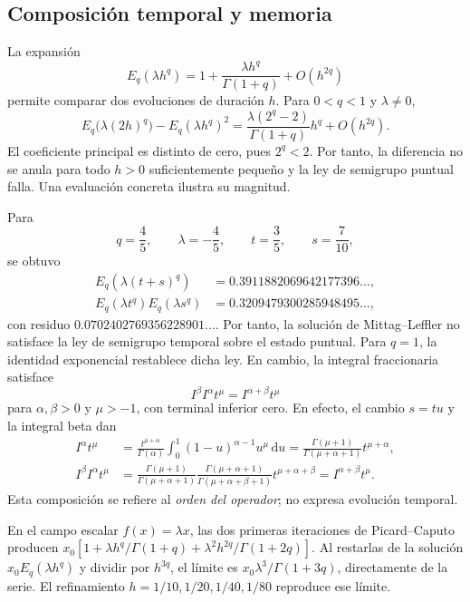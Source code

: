 \subsection{Composición temporal y memoria}

La expansión
\[
 E_q(\lambda h^q)=1+\frac{\lambda h^q}{\Gamma(1+q)}+O(h^{2q})
\]
permite comparar dos evoluciones de duración \(h\). Para \(0<q<1\) y
\(\lambda\ne0\),
\[
 E_q\bigl(\lambda(2h)^q\bigr)-E_q(\lambda h^q)^2
 =\frac{\lambda(2^q-2)}{\Gamma(1+q)}h^q+O(h^{2q}).
\]
El coeficiente principal es distinto de cero, pues \(2^q<2\). Por tanto,
la diferencia no se anula para todo \(h>0\) suficientemente pequeño y la ley
de semigrupo puntual falla. Una evaluación concreta ilustra su magnitud.

Para
\[
 q=\frac45,\qquad \lambda=-\frac45,\qquad
 t=\frac35,\qquad s=\frac7{10},
\]
se obtuvo
\begin{align}
 E_q\!\left(\lambda(t+s)^q\right)
 &=
 0.3911882069642177396\ldots,\\
 E_q(\lambda t^q)E_q(\lambda s^q)
 &=
 0.3209479300285948495\ldots,
\end{align}
con residuo \(0.0702402769356228901\ldots\). Por tanto, la solución de Mittag--Leffler no satisface la ley de semigrupo
temporal sobre el estado puntual. Para \(q=1\), la identidad exponencial
restablece dicha ley. En cambio, la integral fraccionaria satisface
\[
 I^\beta I^\alpha t^\mu=I^{\alpha+\beta}t^\mu
\]
para \(\alpha,\beta>0\) y \(\mu>-1\), con terminal inferior cero. En efecto,
el cambio \(s=tu\) y la integral beta dan
\begin{align*}
 I^\alpha t^\mu
 &=\frac{t^{\mu+\alpha}}{\Gamma(\alpha)}
   \int_0^1(1-u)^{\alpha-1}u^\mu\,\mathrm du
 =\frac{\Gamma(\mu+1)}{\Gamma(\mu+\alpha+1)}t^{\mu+\alpha},\\
 I^\beta I^\alpha t^\mu
 &=\frac{\Gamma(\mu+1)}{\Gamma(\mu+\alpha+1)}
   \frac{\Gamma(\mu+\alpha+1)}{\Gamma(\mu+\alpha+\beta+1)}
   t^{\mu+\alpha+\beta}
 =I^{\alpha+\beta}t^\mu.
\end{align*}
Esta composición se refiere al
\emph{orden del operador}; no expresa evolución temporal.

En el campo escalar \(f(x)=\lambda x\), las dos primeras iteraciones de
Picard--Caputo producen
\(x_0[1+\lambda h^q/\Gamma(1+q)+\lambda^2h^{2q}/\Gamma(1+2q)]\).
Al restarlas de la solución \(x_0E_q(\lambda h^q)\) y dividir por
\(h^{3q}\), el límite es \(x_0\lambda^3/\Gamma(1+3q)\), directamente de
la serie. El refinamiento \(h=1/10,1/20,1/40,1/80\) reproduce ese límite.

